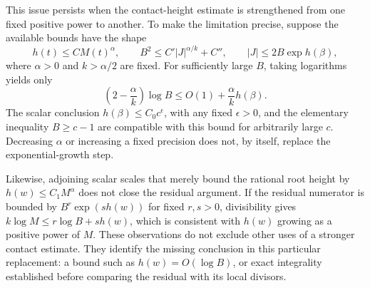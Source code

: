 \documentclass[11pt]{article}
\begin{document}
This issue persists when the contact-height estimate is strengthened
from one fixed positive power to another. To make the limitation
precise, suppose the available bounds have the shape
\[
 h(t)\le C M(t)^\alpha,\qquad
 B^2\le C'|J|^{\alpha/k}+C'',\qquad
 |J|\le2B\exp h(\beta),
\]
where $\alpha>0$ and $k>\alpha/2$ are fixed. For sufficiently large
$B$, taking logarithms yields only
\[
 \left(2-\frac\alpha k\right)\log B
 \le O(1)+\frac\alpha k h(\beta).
\]
The scalar conclusion $h(\beta)\le C_0c^\epsilon$, with any fixed
$\epsilon>0$, and the elementary inequality $B\ge c-1$ are
compatible with this bound for arbitrarily large $c$. Decreasing
$\alpha$ or increasing a fixed precision does not, by itself,
replace the exponential-growth step.

Likewise, adjoining scalar scales that merely bound the rational
root height by $h(w)\le C_1M^\alpha$ does not close the residual
argument. If the residual numerator is bounded by
$B^r\exp(s h(w))$ for fixed $r,s>0$, divisibility gives
$k\log M\le r\log B+s h(w)$, which is consistent with
$h(w)$ growing as a positive power of $M$. These observations do
not exclude other uses of a stronger contact estimate. They identify
the missing conclusion in this particular replacement: a bound such
as $h(w)=O(\log B)$, or exact integrality established before comparing
the residual with its local divisors.
\end{document}
